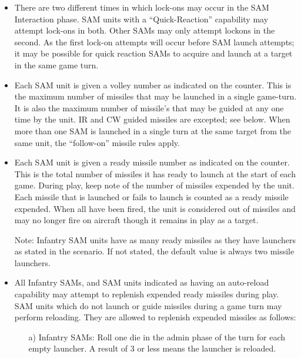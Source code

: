 \begin{itemize}
    \item{} There are two different times in which lock-ons may occur in the SAM Interaction phase. SAM units with a “Quick-Reaction” capability may attempt lock-ons in both. Other SAMs may only attempt lock­ons in the second. As the first lock-on attempts will occur before SAM launch attempts; it may be possible for quick reaction SAMs to acquire and launch at a target in the same game turn.


    \item{} Each SAM unit is given a volley number as indicated on the counter. This is the maximum number of missiles that may be launched in a single game-turn. It is also the maximum number of missile's that may be guided at any one time by the unit. IR and CW guided missiles are excepted; see below. When more than one SAM is launched in a single turn at the same target from the same unit, the “follow-on” missile rules apply.

    \item{} Each SAM unit is given a ready missile number as indicated on the counter. This is the total number of missiles it has ready to launch at the start of each game. During play, keep note of the number of missiles expended by the unit. Each missile that is launched or fails to launch is counted as a ready missile expended. When all have been fired, the unit is considered out of missiles and may no longer fire on aircraft though it remains in play as a target.

    Note: Infantry SAM units have as many ready missiles as they have launchers as stated in the scenario. If not stated, the default value is always two missile launchers.

    \item{} All Infantry SAMs, and SAM units indicated as having an auto-reload capability may attempt to replenish expended ready missiles during play. SAM units which do not launch or guide missiles during a game turn may perform reloading. They are allowed to replenish expended missiles as follows:
    
    \begin{enumerate}
        \item[a)] Infantry SAMs: Roll one die in the admin phase of the turn for each empty launcher. A result of 3 or less means the launcher is reloaded.


\end{enumerate}
\end{itemize}
